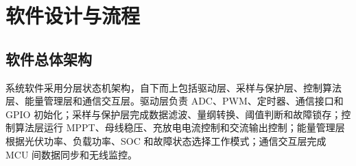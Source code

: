\section{软件设计与流程}

\subsection{软件总体架构}

系统软件采用分层状态机架构，自下而上包括驱动层、采样与保护层、控制算法层、能量管理层和通信交互层。驱动层负责 ADC、PWM、定时器、通信接口和 GPIO 初始化；采样与保护层完成数据滤波、量纲转换、阈值判断和故障锁存；控制算法层运行 MPPT、母线稳压、充放电电流控制和交流输出控制；能量管理层根据光伏功率、负载功率、SOC 和故障状态选择工作模式；通信交互层完成 MCU 间数据同步和无线监控。



